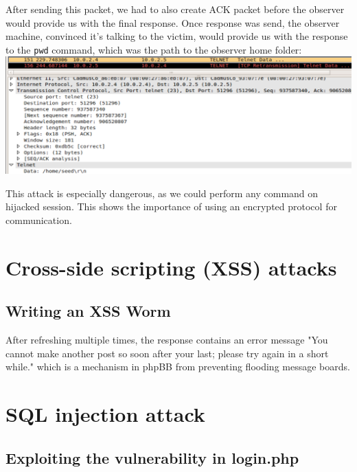 \documentclass[12pt, a4paper, pdflatex]{article}
\begin{document}
After sending this packet, we had to also create ACK packet before the observer would provide us with the final response. Once response was send, the observer machine, convinced it's talking to the victim, would provide us with the response to the \texttt{pwd} command, which was the path to the observer home folder:\\

\includegraphics[width=.95\textwidth]{gfx/response.png}

This attack is especially dangerous, as we could perform any command on hijacked session. This shows the importance of using an encrypted protocol for communication.

\section{Cross-side scripting (XSS) attacks}

\subsection{Writing an XSS Worm}

After refreshing multiple times, the response contains an error message "You cannot make another post so soon after your last; please try again in a short while." which is a mechanism in phpBB from preventing flooding message boards.


\section{SQL injection attack}

\subsection{Exploiting the vulnerability in login.php}
\end{document}
